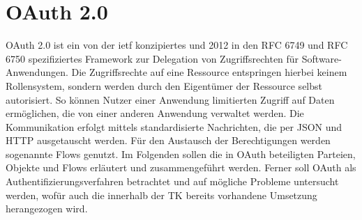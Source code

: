 \chapter{OAuth 2.0} OAuth 2.0 ist ein von der \gls{ietf} konzipiertes und 2012 in den
RFC 6749 und RFC 6750 spezifiziertes Framework zur Delegation von
Zugriffsrechten für Software-Anwendungen. Die Zugriffsrechte auf eine Ressource
entspringen hierbei keinem Rollensystem, sondern werden durch den Eigentümer der
Ressource selbst autorisiert. So können Nutzer einer Anwendung limitierten
Zugriff auf Daten ermöglichen, die von einer anderen Anwendung verwaltet werden.
Die Kommunikation erfolgt mittels standardisierte Nachrichten, die per JSON und
HTTP ausgetauscht werden. Für den Austausch der Berechtigungen werden sogenannte
Flows genutzt. Im Folgenden sollen die in OAuth beteiligten Parteien, Objekte
und Flows erläutert und zusammengeführt werden. Ferner soll OAuth als
Authentifizierungsverfahren betrachtet und auf mögliche Probleme untersucht
werden, wofür auch die innerhalb der TK bereits vorhandene Umsetzung
herangezogen wird.





